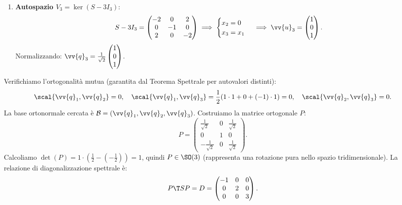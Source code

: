 \begin{dimostrazione}
\begin{enumerate}
    \item \textbf{Autospazio $V_3 = \ker(S - 3I_3)$}:
    \begin{equation}
        S - 3I_3 = \begin{pmatrix} -2 & 0 & 2 \\ 0 & -1 & 0 \\ 2 & 0 & -2 \end{pmatrix} \implies \begin{cases} x_2 = 0 \\ x_3 = x_1 \end{cases} \implies \vv{u}_3 = \begin{pmatrix} 1 \\ 0 \\ 1 \end{pmatrix}.
    \end{equation}
    Normalizzando: $\vv{q}_3 = \frac{1}{\sqrt{2}} \begin{pmatrix} 1 \\ 0 \\ 1 \end{pmatrix}$.
\end{enumerate}
Verifichiamo l'ortogonalità mutua (garantita dal Teorema Spettrale per autovalori distinti):
\begin{equation}
    \scal{\vv{q}_1, \vv{q}_2} = 0, \quad \scal{\vv{q}_1, \vv{q}_3} = \frac{1}{2}(1 \cdot 1 + 0 + (-1) \cdot 1) = 0, \quad \scal{\vv{q}_2, \vv{q}_3} = 0.
\end{equation}
La base ortonormale cercata è $\mathcal{B} = (\vv{q}_1, \vv{q}_2, \vv{q}_3)$. Costruiamo la matrice ortogonale $P$:
\begin{equation}
    P = \begin{pmatrix}
        \frac{1}{\sqrt{2}} & 0 & \frac{1}{\sqrt{2}} \\
        0 & 1 & 0 \\
        -\frac{1}{\sqrt{2}} & 0 & \frac{1}{\sqrt{2}}
    \end{pmatrix}.
\end{equation}
Calcoliamo $\det(P) = 1 \cdot (\frac{1}{2} - (-\frac{1}{2})) = 1$, quindi $P \in \SO(3)$ (rappresenta una rotazione pura nello spazio tridimensionale).
La relazione di diagonalizzazione spettrale è:
\begin{equation}
    P\T S P = D = \begin{pmatrix} -1 & 0 & 0 \\ 0 & 2 & 0 \\ 0 & 0 & 3 \end{pmatrix}.
\end{equation}


\end{dimostrazione}
